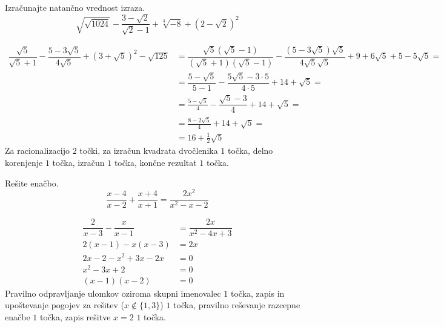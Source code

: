 \documentclass[addpoints,12pt]{exam}
\begin{document}
\begin{questions}


    \question[6]
    Izračunajte natančno vrednost izraza.
    $$ \sqrt{\sqrt{1024}}-\dfrac{3-\sqrt{2}}{\sqrt{2}-1}+\sqrt[3]{-8}+\left(2-\sqrt{2}\right)^2 $$

    \begin{solution}[7cm]
        \begin{align*} 
            \dfrac{\sqrt{5}}{\sqrt{5}+1}-\dfrac{5-3\sqrt{5}}{4\sqrt{5}}+\left(3+\sqrt{5}\right)^2-\sqrt{125}&=\dfrac{\sqrt{5}(\sqrt{5}-1)}{(\sqrt{5}+1)(\sqrt{5}-1)}-\dfrac{(5-3\sqrt{5})\sqrt{5}}{4\sqrt{5}\sqrt{5}}+9+6\sqrt{5}+5-5\sqrt{5}= \\
                                                                                                            &=\dfrac{5-\sqrt{5}}{5-1}-\dfrac{5\sqrt{5}-3\cdot 5}{4\cdot 5}+14+\sqrt{5}= \\
                                                                                                            &=\frac{5-\sqrt{5}}{4}-\dfrac{\sqrt{5}-3}{4}+14+\sqrt{5}= \\
                                                                                                            &=\frac{8-2\sqrt{5}}{4}+14+\sqrt{5}= \\
                                                                                                            &=16+\frac{1}{2}\sqrt{5}
        \end{align*}
        Za racionalizacijo $2$ točki, za izračun kvadrata dvočlenika $1$ točka, delno korenjenje $1$ točka, izračun $1$ točka, končne rezultat $1$ točka.
    \end{solution}
    
    
    \newpage

    \question[4]
    Rešite enačbo.
    $$ \dfrac{x-4}{x-2}+\dfrac{x+4}{x+1}=\dfrac{2x^2}{x^2-x-2} $$
    
    
    \begin{solution}[4cm]
        \begin{align*} 
            \dfrac{2}{x-3}-\dfrac{x}{x-1} &=\dfrac{2x}{x^2-4x+3} \\
            2(x-1)-x(x-3) &= 2x \\
            2x-2-x^2+3x-2x &=0 \\
            x^2-3x+2 &=0 \\
            (x-1)(x-2) &=0
        \end{align*}
        Pravilno odpravljanje ulomkov oziroma skupni imenovalec $1$ točka, zapis in upoštevanje pogojev za rešitev ($x\notin\{1,3\}$) $1$ točka, pravilno reševanje razcepne enačbe $1$ točka, zapis rešitve $x=2$ $1$ točka.
    \end{solution}


\end{questions}
\end{document}
